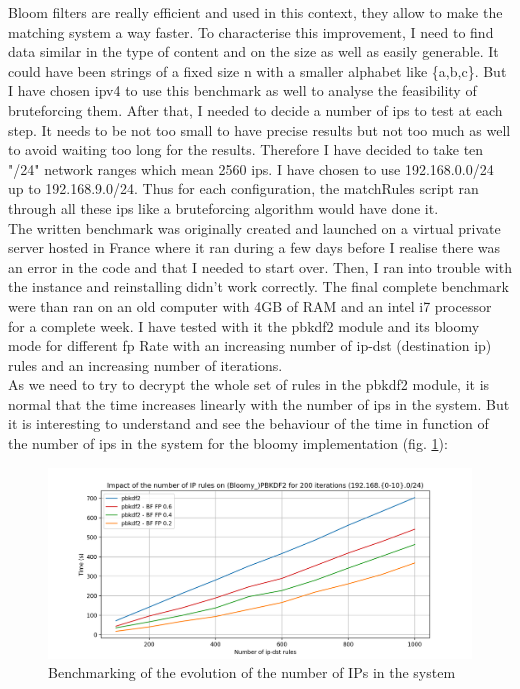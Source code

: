\documentclass{eplmastersthesis}
\begin{document}
Bloom filters are really efficient and used in this context, they allow to make the matching system a way faster. To characterise this improvement, I need to find data similar in the type of content and on the size as well as easily generable. It could have been strings of a fixed size n with a smaller alphabet like \{a,b,c\}. But I have chosen \gls{ipv4} to use this benchmark as well to analyse the feasibility of  bruteforcing them.
After that, I needed to decide a number of \glspl{ip} to test at each step. It needs to be not too small to have precise results but not too much as well to avoid waiting too long for the results. Therefore I have decided to take ten "/24" network ranges which mean 2560 \glspl{ip}. I have chosen to use 192.168.0.0/24 up to 192.168.9.0/24.
Thus for each configuration, the matchRules script ran through all these \glspl{ip} like a bruteforcing algorithm would have done it.\\

The written benchmark was originally created and launched on a virtual private server hosted in France where it ran during a few days before I realise there was an error in the code and that I needed to start over. Then, I ran into trouble with the instance and reinstalling didn't work correctly.
The final complete benchmark were than ran on an old computer with 4GB of RAM and an intel i7 processor for a complete week.
I have tested with it the \gls{pbkdf2} module and its bloomy mode for different \gls{fp} Rate with an increasing number of ip-dst (destination \gls{ip}) rules and an increasing number of iterations.\\

As we need to try to decrypt the whole set of rules in the \gls{pbkdf2} module, it is normal that the time increases linearly with the number of \glspl{ip} in the system. But it is interesting to understand and see the behaviour of the time in function of the number of \glspl{ip} in the system for the bloomy implementation (fig. \ref{benchmarking:timeips}):

\begin{figure}[h!]
\begin{center}
	\includegraphics[scale=0.6]{res/TimeIPs}
	\caption{Benchmarking of the evolution of the number of IPs in the system}
	\label{benchmarking:timeips}
\end{center}
\end{figure}
\end{document}
